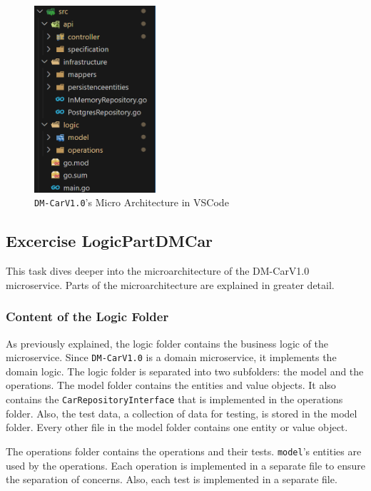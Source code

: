 \begin{figure}
    \centering
    \includegraphics[width=0.4\textwidth]{figures/microservices/dmCar/ms_dmCar_vsCodeStructure.png}
    \caption{\texttt{DM-CarV1.0}'s Micro Architecture in VSCode}
    \label{fig:micro_architecture_vs_code}
\end{figure}


\subsection{Excercise LogicPartDMCar}
This task dives deeper into the microarchitecture of the DM-CarV1.0 microservice.
Parts of the microarchitecture are explained in greater detail.

\subsubsection*{Content of the Logic Folder}
As previously explained, the logic folder contains the business logic of the microservice.
Since \texttt{DM-CarV1.0} is a domain microservice, it implements the domain logic.
The logic folder is separated into two subfolders: the model and the operations.
The model folder contains the entities and value objects.
It also contains the \texttt{CarRepositoryInterface} that is implemented in the operations folder.
Also, the test data, a collection of data for testing, is stored in the model folder.
Every other file in the model folder contains one entity or value object.

The operations folder contains the operations and their tests.
\texttt{model}'s entities are used by the operations.
Each operation is implemented in a separate file to ensure the separation of concerns.
Also, each test is implemented in a separate file.

